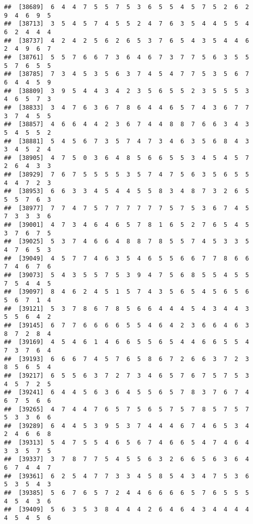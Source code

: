 \documentclass[
]{book}
\begin{document}
\begin{verbatim}
##  [38689]  6  4  4  7  5  5  7  5  3  6  5  5  4  5  7  5  2  6  2  9  4  6  9  5
##  [38713]  3  5  4  5  7  4  5  5  2  4  7  6  3  5  4  4  5  5  4  6  2  4  4  4
##  [38737]  4  2  4  2  5  6  2  6  5  3  7  6  5  4  3  5  4  4  6  2  4  9  6  7
##  [38761]  5  5  7  6  6  7  3  6  4  6  7  3  7  7  5  6  3  5  5  5  7  6  5  5
##  [38785]  7  3  4  5  3  5  6  3  7  4  5  4  7  7  5  3  5  6  7  6  4  4  5  9
##  [38809]  3  9  5  4  4  3  4  2  3  5  6  5  5  2  3  5  5  5  3  4  6  5  7  3
##  [38833]  3  4  7  6  3  6  7  8  6  4  4  6  5  7  4  3  6  7  7  3  7  4  5  5
##  [38857]  4  6  6  4  4  2  3  6  7  4  4  8  8  7  6  6  3  4  3  5  4  5  5  2
##  [38881]  5  4  5  6  7  3  5  7  4  7  3  4  6  3  5  6  8  4  3  3  4  5  2  4
##  [38905]  4  7  5  0  3  6  4  8  5  6  6  5  5  3  4  5  4  5  7  2  6  4  3  3
##  [38929]  7  6  7  5  5  5  5  3  5  7  4  7  5  6  3  5  6  5  5  4  4  7  2  3
##  [38953]  6  6  3  3  4  5  4  4  5  5  8  3  4  8  7  3  2  6  5  5  5  7  6  3
##  [38977]  7  7  4  7  5  7  7  7  7  7  7  5  7  5  3  6  7  4  5  7  3  3  3  6
##  [39001]  4  7  3  4  6  4  6  5  7  8  1  6  5  2  7  6  5  4  5  3  7  6  7  5
##  [39025]  5  3  7  4  6  6  4  8  8  7  8  5  5  7  4  5  3  3  5  4  7  6  5  3
##  [39049]  4  5  7  7  4  6  3  5  4  6  5  5  6  6  7  7  8  6  6  7  4  6  7  6
##  [39073]  5  4  3  5  5  7  5  3  9  4  7  5  6  8  5  5  4  5  5  7  5  4  4  5
##  [39097]  8  4  6  2  4  5  1  5  7  4  3  5  6  5  4  5  6  5  6  5  6  7  1  4
##  [39121]  5  3  7  8  6  7  8  5  6  6  4  4  4  5  4  3  4  4  3  5  5  6  4  2
##  [39145]  6  7  7  6  6  6  6  5  5  4  6  4  2  3  6  6  4  6  3  8  7  2  8  4
##  [39169]  4  5  4  6  1  4  6  6  5  5  6  5  4  4  6  6  5  5  4  7  3  7  6  4
##  [39193]  6  6  6  7  4  5  7  6  5  8  6  7  2  6  6  3  7  2  3  8  5  6  5  4
##  [39217]  6  5  5  6  3  7  2  7  3  4  6  5  7  6  7  5  7  5  3  4  5  7  2  5
##  [39241]  6  4  4  5  6  3  6  4  5  5  6  5  7  8  3  7  6  7  4  6  7  5  6  6
##  [39265]  4  7  4  4  7  6  5  7  5  6  5  7  5  7  8  5  7  5  7  5  3  3  6  6
##  [39289]  6  4  4  5  3  9  5  3  7  4  4  4  6  7  4  6  5  3  4  2  4  6  6  8
##  [39313]  5  4  7  5  5  4  6  5  6  7  4  6  6  5  4  7  4  6  4  3  3  5  7  5
##  [39337]  3  7  8  7  7  5  4  5  5  6  3  2  6  6  5  6  3  6  4  6  7  4  4  7
##  [39361]  6  2  5  4  7  7  3  3  4  5  8  5  4  3  4  7  5  3  6  5  3  5  4  3
##  [39385]  5  6  7  6  5  7  2  4  4  6  6  6  6  5  7  6  5  5  5  4  5  4  3  6
##  [39409]  5  6  3  5  3  8  4  4  4  2  6  4  6  4  3  4  4  4  4  4  5  4  5  6

\end{verbatim}
\end{document}
